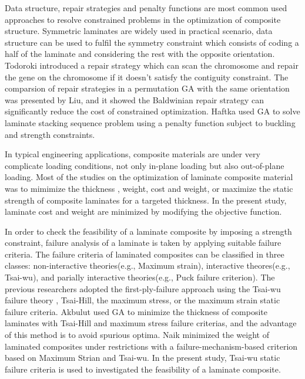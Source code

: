\documentclass[Afour,sagev,times]{sagej}
\begin{document}
Data structure, repair strategies and penalty functions\cite{le1995improved} are most common used
approaches to resolve constrained problems in the optimization of composite structure. Symmetric
laminates are widely used in practical scenario, data structure can be used to fulfil the symmetry
constraint which consists of coding a half of the laminate and considering the rest with the
opposite orientation.  Todoroki\cite{todoroki1998stacking} introduced a repair strategy which can
scan the chromosome and repair the gene on the chromosome if it doesn't satisfy the contiguity
constraint. The comparsion of repair strategies in a permutation GA with the same orientation was
presented by Liu\cite{liu2000permutation}, and it showed the Baldwinian repair strategy can
significantly reduce the cost of constrained optimization. Haftka\cite{riche1993optimization} used
GA to solve laminate stacking sequence problem using a penalty function subject to buckling and
strength constraints.


In typical engineering applications, composite materials are under very
complicate loading conditions, not only in-plane loading but also out-of-plane
loading. Most of the studies on the optimization of laminate composite material
was to mimimize the thickness \cite{abu1998optimum,walker2003technique},
weight\cite{fang1993design,deka2005multiobjective,park2008improved}, cost and
weight\cite{deka2005multiobjective,omkar2008artificial}, or maximize the static
strength of composite laminates for a targeted
thickness\cite{walker2003technique,lin2004stacking,kim2007development}. In the
present study, laminate cost and weight are minimized by modifying the objective function.


In order to check the feasibility of a laminate composite by imposing a
strength constraint, failure analysis of a laminate is taken by applying
suitable failure criteria. The failure criteria of laminated composites can be classified in three
classes: non-interactive theories(e.g., Maximum strain), interactive theores(e.g., Tsai-wu), and
parially interactive theories(e.g., Puck failure criterion). The previous researchers adopted the
first-ply-failure approach using the Tsai-wu failure theory
\cite{massard1984computer,reddy1987first,fang1993design,soeiro1994multilevel,pelletier2006multi,jadhav2007parametric,omkar2008artificial,choudhury2019failure},
Tsai-Hill\cite{martin1987optimum,soares1995discrete}, the maximum
stress\cite{jadhav2007parametric,omkar2008artificial}, or the maximum
strain\cite{watkins1987multicriteria} static failure criteria. Akbulut\cite{akbulut2008optimum} used
GA to minimize the thickness of composite laminates with Tsai-Hill and maximum stress failure
criterias, and the advantage of this method is to avoid spurious optima.  Naik\cite{naik2008design}
minimized the weight of laminated composites under restrictions with a failure-mechanism-based
criterion based on Maximum Strian and Tsai-wu.  In the present study, Tsai-wu static failure
criteria is used to investigated the feasibility of a laminate composite.
\end{document}
